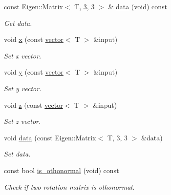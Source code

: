 \begin{DoxyCompactItemize}
\mbox{\label{classddd_1_1rotation_a96ca78d491ccc1c1c5b6be44c18e5abd}} 
const Eigen\+::\+Matrix$<$ T, 3, 3 $>$ \& \hyperlink{classddd_1_1rotation_a96ca78d491ccc1c1c5b6be44c18e5abd}{data} (void) const
\begin{DoxyCompactList}\small\item\em Get data. \end{DoxyCompactList}\item 
void \hyperlink{classddd_1_1rotation_ab1d32f426452f5fc28844c1c7ba486c6}{x} (const \hyperlink{classddd_1_1vector}{vector}$<$ T $>$ \&input)
\begin{DoxyCompactList}\small\item\em Set x vector. \end{DoxyCompactList}\item 
void \hyperlink{classddd_1_1rotation_aeb1179a75b15819f424d212d9b09d818}{y} (const \hyperlink{classddd_1_1vector}{vector}$<$ T $>$ \&input)
\begin{DoxyCompactList}\small\item\em Set y vector. \end{DoxyCompactList}\item 
void \hyperlink{classddd_1_1rotation_add5659b127f52c0796f8eaa5997d9e20}{z} (const \hyperlink{classddd_1_1vector}{vector}$<$ T $>$ \&input)
\begin{DoxyCompactList}\small\item\em Set z vector. \end{DoxyCompactList}\item 
void \hyperlink{classddd_1_1rotation_af70341fadd500946c111eb750e4865a5}{data} (const Eigen\+::\+Matrix$<$ T, 3, 3 $>$ \&data)
\begin{DoxyCompactList}\small\item\em Set data. \end{DoxyCompactList}\item 
\mbox{\label{classddd_1_1rotation_a25fd7a4d0358a92c95b7369db99f542b}} 
const bool \hyperlink{classddd_1_1rotation_a25fd7a4d0358a92c95b7369db99f542b}{is\+\_\+othonormal} (void) const
\begin{DoxyCompactList}\small\item\em Check if two rotation matrix is othonormal. \end{DoxyCompactList}\item 
\mbox{\label{classddd_1_1rotation_a3b71f1f04257a2d519b0e5433d1ae4f3}} 

\end{DoxyCompactItemize}
